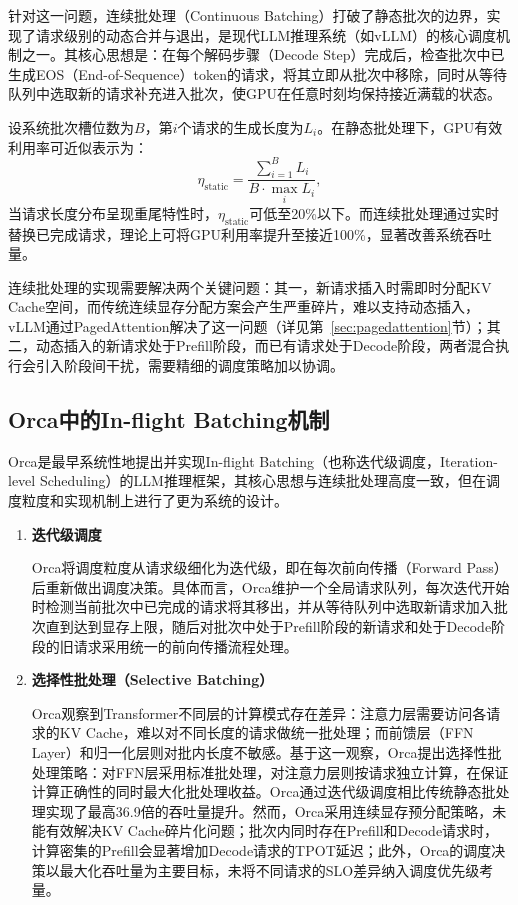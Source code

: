 针对这一问题，连续批处理（Continuous Batching）打破了静态批次的边界，实现了请求级别的动态合并与退出，是现代LLM推理系统（如vLLM\cite{kwon2023efficient}）的核心调度机制之一。其核心思想是：在每个解码步骤（Decode Step）完成后，检查批次中已生成EOS（End-of-Sequence）token的请求，将其立即从批次中移除，同时从等待队列中选取新的请求补充进入批次，使GPU在任意时刻均保持接近满载的状态。

设系统批次槽位数为$B$，第$i$个请求的生成长度为$L_i$。在静态批处理下，GPU有效利用率可近似表示为：
\begin{equation}
  \eta_{\text{static}} = \frac{\sum_{i=1}^{B} L_i}{B \cdot \max_{i} L_i} ,
  \label{eq:static_util}
\end{equation}
当请求长度分布呈现重尾特性时，$\eta_{\text{static}}$可低至20\%以下。而连续批处理通过实时替换已完成请求，理论上可将GPU利用率提升至接近100\%，显著改善系统吞吐量。

连续批处理的实现需要解决两个关键问题：其一，新请求插入时需即时分配KV Cache空间，而传统连续显存分配方案会产生严重碎片，难以支持动态插入，vLLM通过PagedAttention解决了这一问题（详见第~\ref{sec:pagedattention}节）；其二，动态插入的新请求处于Prefill阶段，而已有请求处于Decode阶段，两者混合执行会引入阶段间干扰，需要精细的调度策略加以协调。

\subsection{Orca中的In-flight Batching机制}

Orca\cite{Orca}是最早系统性地提出并实现In-flight Batching（也称迭代级调度，Iteration-level Scheduling）的LLM推理框架，其核心思想与连续批处理高度一致，但在调度粒度和实现机制上进行了更为系统的设计。

\begin{enumerate}
    
\item \textbf{迭代级调度}

Orca将调度粒度从请求级细化为迭代级，即在每次前向传播（Forward Pass）后重新做出调度决策。具体而言，Orca维护一个全局请求队列，每次迭代开始时检测当前批次中已完成的请求将其移出，并从等待队列中选取新请求加入批次直到达到显存上限，随后对批次中处于Prefill阶段的新请求和处于Decode阶段的旧请求采用统一的前向传播流程处理。

\item \textbf{选择性批处理（Selective Batching）}

Orca观察到Transformer\cite{transformers}不同层的计算模式存在差异：注意力层需要访问各请求的KV Cache，难以对不同长度的请求做统一批处理；而前馈层（FFN Layer）和归一化层则对批内长度不敏感。基于这一观察，Orca提出选择性批处理策略：对FFN层采用标准批处理，对注意力层则按请求独立计算，在保证计算正确性的同时最大化批处理收益。Orca通过迭代级调度相比传统静态批处理实现了最高36.9倍的吞吐量提升\cite{Orca}。然而，Orca采用连续显存预分配策略，未能有效解决KV Cache碎片化问题；批次内同时存在Prefill和Decode请求时，计算密集的Prefill会显著增加Decode请求的TPOT延迟；此外，Orca的调度决策以最大化吞吐量为主要目标，未将不同请求的SLO差异纳入调度优先级考量。

 
\end{enumerate}

